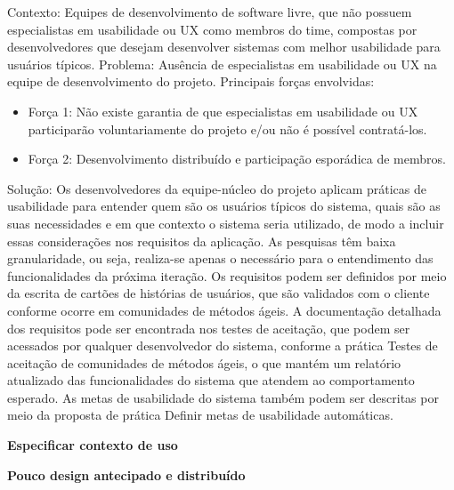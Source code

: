 Contexto: Equipes de desenvolvimento de software livre, que não possuem especialistas em usabilidade ou UX como membros do time, compostas por desenvolvedores que desejam desenvolver sistemas com melhor usabilidade para usuários típicos.
Problema: Ausência de especialistas em usabilidade ou UX na equipe de desenvolvimento do projeto. Principais forças envolvidas:
\begin{itemize}
\item Força 1: Não existe garantia de que especialistas em usabilidade ou UX participarão voluntariamente do projeto e/ou não é possível contratá-los.
\item Força 2: Desenvolvimento distribuído e participação esporádica de membros.
\end{itemize}
Solução: Os desenvolvedores da equipe-núcleo do projeto aplicam práticas de usabilidade para entender quem são os usuários típicos do sistema, quais são as suas necessidades e em que contexto o sistema seria utilizado, de modo a incluir essas considerações nos requisitos da aplicação. As pesquisas têm baixa granularidade, ou seja, realiza-se apenas o necessário para o entendimento das funcionalidades da próxima iteração. Os requisitos podem ser definidos por meio da escrita de cartões de histórias de usuários, que são validados com o cliente conforme ocorre em comunidades de métodos ágeis. A documentação detalhada dos requisitos pode ser encontrada nos testes de aceitação, que podem ser acessados por qualquer desenvolvedor do sistema, conforme a prática Testes de aceitação de comunidades de métodos ágeis, o que mantém um relatório atualizado das funcionalidades do sistema que atendem ao comportamento esperado. As metas de usabilidade do sistema também podem ser descritas por meio da proposta de prática Definir metas de usabilidade automáticas.


%
\textbf{Especificar contexto de uso}

\textbf{Pouco design antecipado e distribuído}

